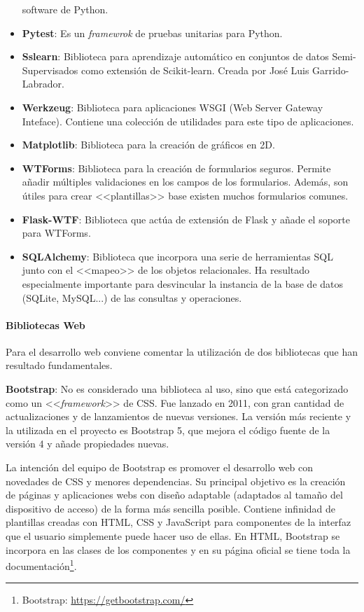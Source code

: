 \begin{itemize}
	software de Python.
	\item \textbf{Pytest}: Es un \emph{framewrok} de pruebas unitarias para
	Python.
	\item \textbf{Sslearn}: Biblioteca para aprendizaje automático en conjuntos de
	datos Semi-Supervisados como extensión de Scikit-learn. Creada por José Luis
	Garrido-Labrador.
	\item \textbf{Werkzeug}: Biblioteca para aplicaciones WSGI (Web Server Gateway
	Inteface). Contiene una colección de utilidades para este tipo de
	aplicaciones.
	\item \textbf{Matplotlib}: Biblioteca para la creación de gráficos en 2D.
	\item \textbf{WTForms}: Biblioteca para la creación de formularios seguros.
	Permite añadir múltiples validaciones en los campos de los formularios.
	Además, son útiles para crear <<plantillas>> base existen muchos formularios
	comunes.
	\item \textbf{Flask-WTF}: Biblioteca que actúa de extensión de Flask y añade
	el soporte para WTForms.
	\item \textbf{SQLAlchemy}: Biblioteca que incorpora una serie de herramientas
	SQL junto con el <<mapeo>> de los objetos relacionales. Ha resultado
	especialmente importante para desvincular la instancia de la base de datos
	(SQLite, MySQL...) de las consultas y operaciones.
\end{itemize}

\paragraph{Bibliotecas Web} Para el desarrollo web conviene comentar la
utilización de dos bibliotecas que han resultado fundamentales.

\textbf{Bootstrap}: No es considerado una biblioteca al uso, sino que está
categorizado como un <<\emph{framework}>> de CSS. Fue lanzado en 2011, con gran
cantidad de actualizaciones y de lanzamientos de nuevas versiones. La versión
más reciente y la utilizada en el proyecto es Bootstrap 5, que mejora el código
fuente de la versión 4 y añade propiedades nuevas. 

La intención del equipo de Bootstrap es promover el desarrollo web con novedades
de CSS y menores dependencias. Su principal objetivo es la creación de páginas y
aplicaciones webs con diseño adaptable (adaptados al tamaño del dispositivo de
acceso) de la forma más sencilla posible. Contiene infinidad de plantillas
creadas con HTML, CSS y JavaScript para componentes de la interfaz que el
usuario simplemente puede hacer uso de ellas. En HTML, Bootstrap se incorpora en
las clases de los componentes y en su página oficial se tiene toda la
documentación\footnote{Bootstrap: \url{https://getbootstrap.com/}}.


